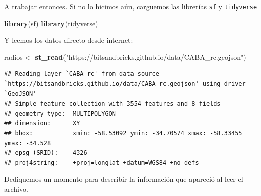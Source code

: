 \documentclass[]{book}
\newenvironment{Shaded}{\begin{snugshade}}{\end{snugshade}}
\newcommand{\KeywordTok}[1]{\textcolor[rgb]{0.13,0.29,0.53}{\textbf{#1}}}
\newcommand{\StringTok}[1]{\textcolor[rgb]{0.31,0.60,0.02}{#1}}
\newcommand{\NormalTok}[1]{#1}
\begin{document}
A trabajar entonces. Si no lo hicimos aún, carguemos las librerías
\texttt{sf} y \texttt{tidyverse}

\begin{Shaded}
\begin{Highlighting}[]
\KeywordTok{library}\NormalTok{(sf)}
\KeywordTok{library}\NormalTok{(tidyverse)}
\end{Highlighting}
\end{Shaded}

Y leemos los datos directo desde internet:

\begin{Shaded}
\begin{Highlighting}[]
\NormalTok{radios <-}\StringTok{ }\KeywordTok{st_read}\NormalTok{(}\StringTok{"https://bitsandbricks.github.io/data/CABA_rc.geojson"}\NormalTok{)}
\end{Highlighting}
\end{Shaded}

\begin{verbatim}
## Reading layer `CABA_rc' from data source `https://bitsandbricks.github.io/data/CABA_rc.geojson' using driver `GeoJSON'
## Simple feature collection with 3554 features and 8 fields
## geometry type:  MULTIPOLYGON
## dimension:      XY
## bbox:           xmin: -58.53092 ymin: -34.70574 xmax: -58.33455 ymax: -34.528
## epsg (SRID):    4326
## proj4string:    +proj=longlat +datum=WGS84 +no_defs
\end{verbatim}

Dediquemos un momento para describir la información que apareció al leer
el archivo.
\end{document}
